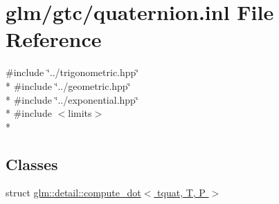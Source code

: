 \hypertarget{gtc_2quaternion_8inl}{\section{glm/gtc/quaternion.inl File Reference}
\label{gtc_2quaternion_8inl}
}
{\ttfamily \#include \char`\"{}../trigonometric.\-hpp\char`\"{}}\\*
{\ttfamily \#include \char`\"{}../geometric.\-hpp\char`\"{}}\\*
{\ttfamily \#include \char`\"{}../exponential.\-hpp\char`\"{}}\\*
{\ttfamily \#include $<$limits$>$}\\*
\subsection*{Classes}
\begin{DoxyCompactItemize}
\item 
struct \hyperlink{structglm_1_1detail_1_1compute__dot_3_01tquat_00_01T_00_01P_01_4}{glm\-::detail\-::compute\-\_\-dot$<$ tquat, T, P $>$}
\end{DoxyCompactItemize}

